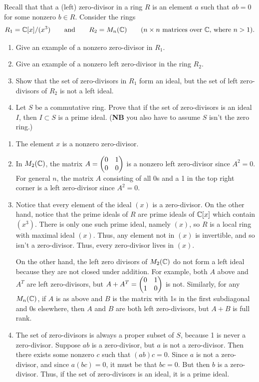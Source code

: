 \begin{question}[subtitle = January 2018 Problem 2,ID=Jan18_2]
Recall that that a (left) zero-divisor in a ring $R$ is an element $a$ such that $ab = 0$ for some nonzero $b \in R$. Consider the rings
\[R_1 = \mathbb{C}[x]/(x^3) \qquad \text{and} \qquad R_2 = M_n(\mathbb{C}) \qquad (\text{$n \times n$ matrices over $\mathbb{C}$, where $n > 1$}).\]
\begin{enumerate}
    \item Give an example of a nonzero zero-divisor in $R_1$.
    \item Give an example of a nonzero left zero-divisor in the ring $R_2$.
    \item Show that the set of zero-divisors in $R_1$ form an ideal, but the set of left zero-divisors of $R_2$ is not a left ideal.
    \item Let $S$ be a commutative ring. Prove that if the set of zero-divisors is an ideal $I$, then $I \subset S$ is a prime ideal. (\textbf{NB} you also have to assume $S$ isn't the zero ring.)
\end{enumerate}
\end{question}
\begin{solution}
\begin{enumerate}
    \item The element $x$ is a nonzero zero-divisor.
    \item In $M_2(\mathbb{C})$, the matrix $A = \begin{pmatrix}{0} & {1}\\{0} & {0}\end{pmatrix}$ is a nonzero left zero-divisor since $A^2 = 0$. For general $n$, the matrix $A$ consisting of all 0s and a 1 in the top right corner is a left zero-divisor since $A^2 = 0$.
    \item Notice that every element of the ideal $(x)$ is a zero-divisor. On the other hand, notice that the prime ideals of $R$ are prime ideals of $\mathbb{C}[x]$ which contain $(x^3)$. There is only one such prime ideal, namely $(x)$, so $R$ is a local ring with maximal ideal $(x)$. Thus, any element not in $(x)$ is invertible, and so isn't a zero-divisor. Thus, every zero-divisor lives in $(x)$.

    On the other hand, the left zero divisors of $M_2(\mathbb{C})$ do not form a left ideal because they are not closed under addition. For example, both $A$ above and $A^T$ are left zero-divisors, but $A+A^T = \begin{pmatrix}{0} & {1}\\{1} & {0}\end{pmatrix}$ is not. Similarly, for any $M_n(\mathbb{C})$, if $A$ is as above and $B$ is the matrix with 1s in the first subdiagonal and 0s elsewhere, then $A$ and $B$ are both left zero-divisors, but $A+B$ is full rank.
    \item The set of zero-divisors is always a proper subset of $S$, because 1 is never a zero-divisor. Suppose $ab$ is a zero-divisor, but $a$ is not a zero-divisor. Then there exists some nonzero $c$ such that $(ab)c = 0$. Since $a$ is not a zero-divisor, and since $a(bc) = 0$, it must be that $bc = 0$. But then $b$ is a zero-divisor. Thus, if the set of zero-divisors is an ideal, it is a prime ideal.
\end{enumerate}
\end{solution}

